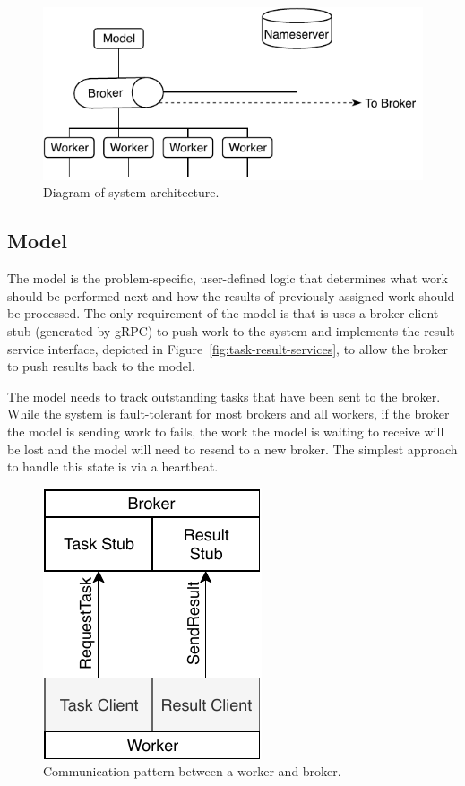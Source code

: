 \documentclass[conference]{IEEEtran}
\begin{document}
\begin{figure}
  \centering
  \includegraphics[width=.85\columnwidth]{img/system-arch.pdf}
  \caption{Diagram of system architecture.}
  \label{fig:sys-arch}
\end{figure}

\subsection{Model}
The model is the problem-specific, user-defined logic that determines what work
should be performed next and how the results of previously assigned work should
be processed. The only requirement of the model is that is uses a broker client
stub (generated by gRPC) to push work to the system and implements the result
service interface, depicted in Figure~\ref{fig:task-result-services}, to allow
the broker to push results back to the model.

The model needs to track outstanding tasks that have been sent to the broker.
While the system is fault-tolerant for most brokers and all workers, if the
broker the model is sending work to fails, the work the model is waiting to
receive will be lost and the model will need to resend to a new broker. The
simplest approach to handle this state is via a heartbeat.

\begin{figure}
  \centering
  \includegraphics{img/broker_worker}
  \caption{Communication pattern between a worker and broker.}
  \label{fig:worker-broker}
\end{figure}
\end{document}
